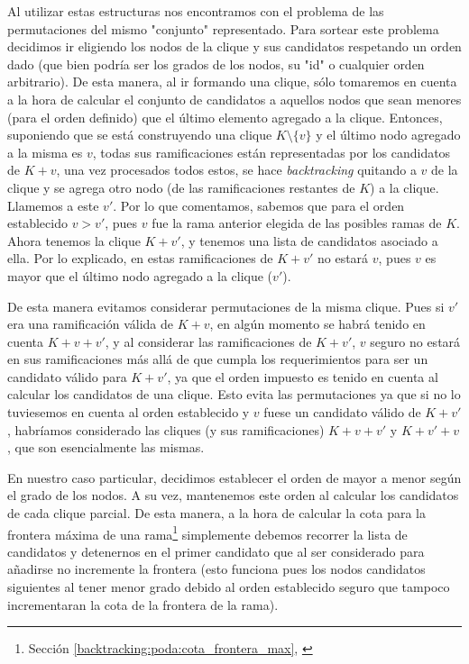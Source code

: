 \par Al utilizar estas estructuras nos encontramos
    con el problema de las permutaciones del mismo "conjunto" representado. Para sortear
    este problema decidimos ir eligiendo los nodos de la clique y sus candidatos respetando
    un orden dado (que bien podr\'ia ser los grados de los nodos, su "id" o cualquier orden
    arbitrario). De esta manera, al ir formando una clique, s\'olo tomaremos en cuenta a
    la hora de calcular el conjunto de candidatos a aquellos nodos que sean menores (para
    el orden definido) que el \'ultimo elemento agregado a la clique. Entonces, suponiendo
    que se est\'a construyendo una clique $K\setminus\{v\}$ y el \'ultimo nodo agregado a la misma es $v$,
    todas sus ramificaciones est\'an representadas por los candidatos de $K+v$, una vez
    procesados todos estos, se hace \emph{backtracking} quitando a $v$ de la clique y se
    agrega otro nodo (de las ramificaciones restantes de $K$) a la clique. Llamemos a este
    $v'$. Por lo que comentamos, sabemos que para el orden establecido $v > v'$, pues
    $v$ fue la rama anterior elegida de las posibles ramas de $K$. Ahora tenemos la
    clique $K+v'$, y tenemos una lista de candidatos asociado a ella. Por lo explicado,
    en estas ramificaciones de $K+v'$ no estar\'a $v$, pues $v$ es mayor que el \'ultimo
    nodo agregado a la clique ($v'$).

\par De esta manera evitamos considerar permutaciones de la misma clique. Pues si $v'$
    era una ramificaci\'on v\'alida de $K+v$, en alg\'un momento se habr\'a tenido
    en cuenta $K+v+v'$, y al considerar las ramificaciones de $K+v'$, $v$ seguro
    no estar\'a en sus ramificaciones m\'as all\'a de que cumpla los requerimientos
    para ser un candidato v\'alido para $K+v'$, ya que el orden impuesto es tenido
    en cuenta al calcular los candidatos de una clique. Esto evita las permutaciones ya
    que si no lo tuviesemos en cuenta al orden establecido y $v$ fuese un candidato
    v\'alido de $K+v'$, habr\'iamos considerado las cliques (y sus ramificaciones)
    $K+v+v'$ y $K+v'+v$, que son esencialmente las mismas.

\par En nuestro caso particular, decidimos establecer el orden de mayor a menor
    seg\'un el grado de los nodos. A su vez, mantenemos este orden al calcular
    los candidatos de cada clique parcial. De esta manera, a la hora de calcular
    la cota para la frontera m\'axima de una rama\footnote{Secci\'on
    \ref{backtracking:poda:cota_frontera_max},
    \emph{}}
    simplemente debemos recorrer la lista de candidatos y detenernos en el primer
    candidato que al ser considerado para a\~nadirse no incremente la frontera
    (esto funciona pues los nodos candidatos siguientes al tener menor grado
    debido al orden establecido seguro que tampoco incrementaran la cota
    de la frontera de la rama). \label{orden_establecido}

